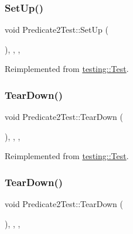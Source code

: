 \mbox{\label{class_predicate2_test_a18b81bef55647028d072d59dea11055f}} 
\subsubsection{\texorpdfstring{SetUp()}{SetUp()}\hspace{0.1cm}{\footnotesize\ttfamily [3/3]}}
{\footnotesize\ttfamily void Predicate2\+Test\+::\+Set\+Up (\begin{DoxyParamCaption}{ }\end{DoxyParamCaption})\hspace{0.3cm}{\ttfamily [inline]}, {\ttfamily [override]}, {\ttfamily [protected]}, {\ttfamily [virtual]}}



Reimplemented from \mbox{\hyperlink{classtesting_1_1_test_a190315150c303ddf801313fd1a777733}{testing\+::\+Test}}.

\mbox{\label{class_predicate2_test_ad1092fca5badfb925a576949f63e872b}} 
\subsubsection{\texorpdfstring{TearDown()}{TearDown()}\hspace{0.1cm}{\footnotesize\ttfamily [1/3]}}
{\footnotesize\ttfamily void Predicate2\+Test\+::\+Tear\+Down (\begin{DoxyParamCaption}{ }\end{DoxyParamCaption})\hspace{0.3cm}{\ttfamily [inline]}, {\ttfamily [override]}, {\ttfamily [protected]}, {\ttfamily [virtual]}}



Reimplemented from \mbox{\hyperlink{classtesting_1_1_test_a5f0ab439802cbe0ef7552f1a9f791923}{testing\+::\+Test}}.

\mbox{\label{class_predicate2_test_ad1092fca5badfb925a576949f63e872b}} 
\subsubsection{\texorpdfstring{TearDown()}{TearDown()}\hspace{0.1cm}{\footnotesize\ttfamily [2/3]}}
{\footnotesize\ttfamily void Predicate2\+Test\+::\+Tear\+Down (\begin{DoxyParamCaption}{ }\end{DoxyParamCaption})\hspace{0.3cm}{\ttfamily [inline]}, {\ttfamily [override]}, {\ttfamily [protected]}, {\ttfamily [virtual]}}



